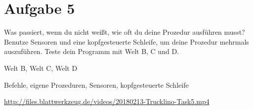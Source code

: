 \section*{Aufgabe 5}
\label{sec:exercises:5}

Was passiert, wenn du nicht weißt, wie oft du deine Prozedur ausführen musst? Benutze Sensoren und eine kopfgesteuerte Schleife, um deine Prozedur mehrmals auszuführen. Teste dein Programm mit Welt B, C und D.

\begin{description}[noitemsep]
  \item[Welt wählen:] Welt B, Welt C, Welt D
  \item[Du brauchst:] Befehle, eigene Prozeduren, Sensoren, kopfgesteuerte Schleife
  \item[Video:] \url{http://files.blattwerkzeug.de/videos/20180213-Trucklino-Task5.mp4}
\end{description}

